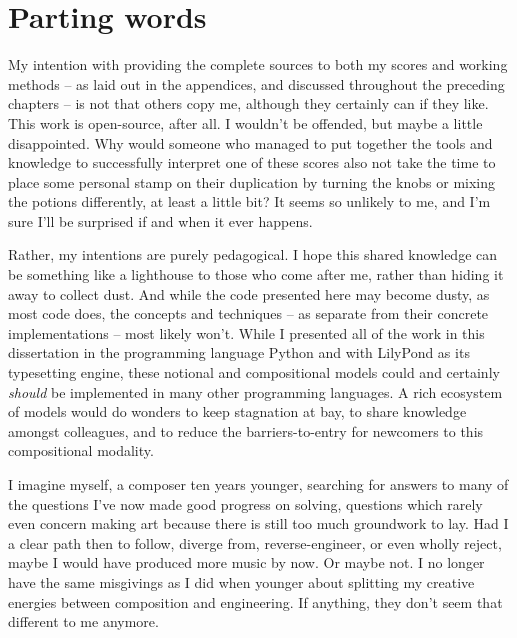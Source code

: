 \section{Parting words}
\label{sec:parting-words}

My intention with providing the complete sources to both my scores and working
methods -- as laid out in the appendices, and discussed throughout the
preceding chapters -- is not that others copy me, although they certainly can
if they like. This work is open-source, after all. I wouldn't be offended, but
maybe a little disappointed. Why would someone who managed to put together the
tools and knowledge to successfully interpret one of these scores also not take
the time to place some personal stamp on their duplication by turning the knobs
or mixing the potions differently, at least a little bit? It seems so unlikely
to me, and I'm sure I'll be surprised if and when it ever happens.

Rather, my intentions are purely pedagogical. I hope this shared knowledge can
be something like a lighthouse to those who come after me, rather than hiding it
away to collect dust. And while the code presented here may become dusty, as
most code does, the concepts and techniques -- as separate from their concrete
implementations -- most likely won't. While I presented all of the work in this
dissertation in the programming language Python and with LilyPond as its
typesetting engine, these notional and compositional models could and certainly
\emph{should} be implemented in many other programming languages. A rich
ecosystem of models would do wonders to keep stagnation at bay, to share
knowledge amongst colleagues, and to reduce the barriers-to-entry for newcomers
to this compositional modality.

I imagine myself, a composer ten years younger, searching for answers to many
of the questions I've now made good progress on solving, questions which rarely
even concern making art because there is still too much groundwork to lay. Had
I a clear path then to follow, diverge from, reverse-engineer, or even wholly
reject, maybe I would have produced more music by now. Or maybe not. I no
longer have the same misgivings as I did when younger about splitting my
creative energies between composition and engineering. If anything, they don't
seem that different to me anymore.

\vspace{\baselineskip}

